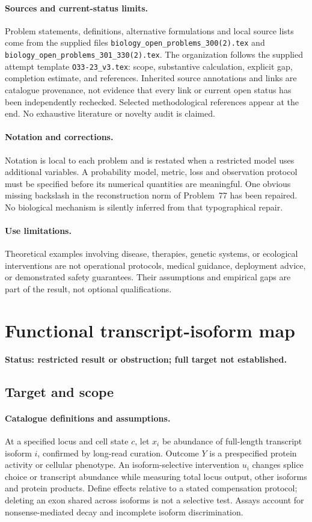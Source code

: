 \documentclass[11pt]{article}
\begin{document}
\paragraph{Sources and current-status limits.}
Problem statements, definitions, alternative formulations and local source lists
come from the supplied files
\texttt{biology\_open\_problems\_300(2).tex} and
\texttt{biology\_open\_problems\_301\_330(2).tex}.
The organization follows the supplied attempt template
\texttt{O33-23\_v3.tex}: scope, substantive calculation, explicit gap,
completion estimate, and references. Inherited source annotations and links are
catalogue provenance, not evidence that every link or current open status has
been independently rechecked. Selected methodological references appear at the
end. No exhaustive literature or novelty audit is claimed.

\paragraph{Notation and corrections.}
Notation is local to each problem and is restated when a restricted model uses
additional variables. A probability model, metric, loss and observation protocol
must be specified before its numerical quantities are meaningful. One obvious
missing backslash in the reconstruction norm of Problem~77 has been repaired.
No biological mechanism is silently inferred from that typographical repair.

\paragraph{Use limitations.}
Theoretical examples involving disease, therapies, genetic systems, or ecological
interventions are not operational protocols, medical guidance, deployment advice,
or demonstrated safety guarantees. Their assumptions and empirical gaps are part
of the result, not optional qualifications.


\section*{Functional transcript-isoform map}
\label{prob:034}
\noindent\textbf{Status: restricted result or obstruction; full target not established.}
\subsection{Target and scope}
\paragraph{Catalogue definitions and assumptions.}
At a specified locus and cell state $c$, let $x_i$ be abundance of full-length transcript isoform $i$, confirmed by long-read curation. Outcome $Y$ is a prespecified protein activity or cellular phenotype. An isoform-selective intervention $u_i$ changes splice choice or transcript abundance while measuring total locus output, other isoforms and protein products. Define effects relative to a stated compensation protocol; deleting an exon shared across isoforms is not a selective test. Assays account for nonsense-mediated decay and incomplete isoform discrimination.
\end{document}
